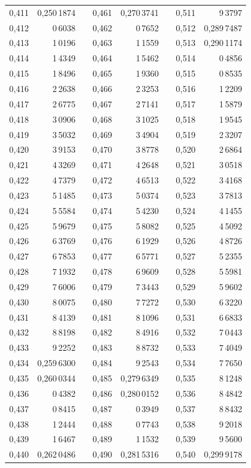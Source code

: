 \begin{tabular}{|r|r|@{}p{9pt}@{}|r|r|@{}p{9pt}@{}|r|r|}
0,411 & 0,250\,1874 &  & 0,461 & 0,270\,3741 &  & 0,511 & 9\,3797 \\
0,412 & 0\,6038 &  & 0,462 & 0\,7652 &  & 0,512 & 0,289\,7487 \\
0,413 & 1\,0196 &  & 0,463 & 1\,1559 &  & 0,513 & 0,290\,1174 \\
0,414 & 1\,4349 &  & 0,464 & 1\,5462 &  & 0,514 & 0\,4856 \\
0,415 & 1\,8496 &  & 0,465 & 1\,9360 &  & 0,515 & 0\,8535 \\[3pt]
0,416 & 2\,2638 &  & 0,466 & 2\,3253 &  & 0,516 & 1\,2209 \\
0,417 & 2\,6775 &  & 0,467 & 2\,7141 &  & 0,517 & 1\,5879 \\
0,418 & 3\,0906 &  & 0,468 & 3\,1025 &  & 0,518 & 1\,9545 \\
0,419 & 3\,5032 &  & 0,469 & 3\,4904 &  & 0,519 & 2\,3207 \\
0,420 & 3\,9153 &  & 0,470 & 3\,8778 &  & 0,520 & 2\,6864 \\[3pt]
0,421 & 4\,3269 &  & 0,471 & 4\,2648 &  & 0,521 & 3\,0518 \\
0,422 & 4\,7379 &  & 0,472 & 4\,6513 &  & 0,522 & 3\,4168 \\
0,423 & 5\,1485 &  & 0,473 & 5\,0374 &  & 0,523 & 3\,7813 \\
0,424 & 5\,5584 &  & 0,474 & 5\,4230 &  & 0,524 & 4\,1455 \\
0,425 & 5\,9679 &  & 0,475 & 5\,8082 &  & 0,525 & 4\,5092 \\[3pt]
0,426 & 6\,3769 &  & 0,476 & 6\,1929 &  & 0,526 & 4\,8726 \\
0,427 & 6\,7853 &  & 0,477 & 6\,5771 &  & 0,527 & 5\,2355 \\
0,428 & 7\,1932 &  & 0,478 & 6\,9609 &  & 0,528 & 5\,5981 \\
0,429 & 7\,6006 &  & 0,479 & 7\,3443 &  & 0,529 & 5\,9602 \\
0,430 & 8\,0075 &  & 0,480 & 7\,7272 &  & 0,530 & 6\,3220 \\[3pt]
0,431 & 8\,4139 &  & 0,481 & 8\,1096 &  & 0,531 & 6\,6833 \\
0,432 & 8\,8198 &  & 0,482 & 8\,4916 &  & 0,532 & 7\,0443 \\
0,433 & 9\,2252 &  & 0,483 & 8\,8732 &  & 0,533 & 7\,4049 \\
0,434 & 0,259\,6300 &  & 0,484 & 9\,2543 &  & 0,534 & 7\,7650 \\
0,435 & 0,260\,0344 &  & 0,485 & 0,279\,6349 &  & 0,535 & 8\,1248 \\[3pt]
0,436 & 0\,4382 &  & 0,486 & 0,280\,0152 &  & 0,536 & 8\,4842 \\
0,437 & 0\,8415 &  & 0,487 & 0\,3949 &  & 0,537 & 8\,8432 \\
0,438 & 1\,2444 &  & 0,488 & 0\,7743 &  & 0,538 & 9\,2018 \\
0,439 & 1\,6467 &  & 0,489 & 1\,1532 &  & 0,539 & 9\,5600 \\
0,440 & 0,262\,0486 &  & 0,490 & 0,281\,5316 &  & 0,540 & 0,299\,9178 \\
\hline
\end{tabular}\par
